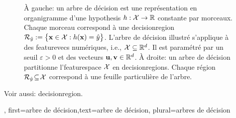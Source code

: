 {{\begin{figure}[H]
\begin{minipage}{.45\textwidth}
			\end{minipage}
			\caption{À gauche: un arbre de décision est une représentation en organigramme d’une \gls{hypothesis} $h: \mathcal{X} \rightarrow \mathbb{R}$ constante par morceaux. Chaque morceau correspond à une \gls{decisionregion} $\mathcal{R}_{\hat{y}} := \big\{ {\bf x} \in  \mathcal{X}: h({\bf x}) = \hat{y} \big\}$. 
				L’arbre de décision illustré s’applique à des \glspl{featurevec} numériques, i.e., $\mathcal{X} \subseteq \mathbb{R}^{d}$. Il est paramétré par un seuil $\varepsilon > 0$ et des vecteurs ${\bf u}, {\bf v} \in \mathbb{R}^{d}$. 
				À droite: un arbre de décision partitionne l’\gls{featurespace} $\mathcal{X}$ en \glspl{decisionregion}. Chaque région $\mathcal{R}_{\hat{y}} \!\subseteq\!\mathcal{X}$ correspond à une feuille particulière de l’arbre.}
			\label{fig_decision_tree}
		\end{figure}
	Voir aussi: \gls{decisionregion}.
	},
	first={arbre de décision},text={arbre de décision}, plural={arbres de décision}
}

